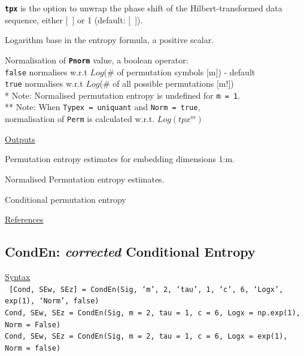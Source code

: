 \documentclass[12pt, a4paper, titlepage, openany]{book}
\begin{document}
\begin{description}[labelsep=1cm, labelwidth=2cm, nosep, style=multiline,leftmargin=3cm]
\begin{description}[labelsep=10em, labelwidth=4em, nosep,style=multiline,leftmargin=3cm]
	\item[\texttt{\emph{phase}}]	\textbf{\texttt{tpx}} is the option to unwrap the phase shift of the Hilbert-transformed data sequence, either [\ ] or 1 (default: [\ ]).				
	\end{description}
\item[\texttt{Logx}]	Logarithm base in the entropy formula, a positive scalar.
\item[\texttt{Norm}]    Normalisation of \texttt{\textbf{Pnorm}} value, a boolean operator:\\
					\texttt{false} \hspace{10pt} normalises w.r.t $Log$($\#$ of permutation symbols [m]) - default\\
     		  		\texttt{true} \hspace{15pt} normalises w.r.t $Log$($\#$ of all possible permutations [m!])\\
     		  			* Note: Normalised permutation entropy is undefined for \texttt{m = 1}.\\
     		  			** Note: When \texttt{Typex = uniquant} and \texttt{Norm = true},\\ 									normalisation of \texttt{Perm} is calculated w.r.t. $Log(tpx^m)$
\end{description}

\noindent \ul{Outputs}
\begin{description}[labelsep=1cm, labelwidth=2cm, nosep, style=multiline,leftmargin=3cm]\footnotesize
\item[\texttt{Perm}]	Permutation entropy estimates for embedding dimensions 1:m.
\item[\texttt{Pnorm}]	Normalised Permutation entropy estimates.
\item[\texttt{cPE}]		Conditional permutation entropy \cite{Perm8}
\end{description}

\noindent \ul{References}\hspace{1cm}
\cite{Perm1} \cite{Perm2} \cite{Perm3} \cite{Perm4} \cite{Perm5} \cite{Perm6} \cite{Perm7} \cite{Perm8} \cite{Perm9}



\newpage
\subsection{\normalsize CondEn: \hspace{15mm} \textit{corrected} Conditional Entropy} \label{CondEn}
\noindent\ul{Syntax} \vspace{6mm} \\ \noindent \texttt{\footnotesize
[Cond, SEw, SEz] = CondEn(Sig, ‘m’, 2, ‘tau’, 1, ‘c’, 6, ‘Logx’, exp(1), ‘Norm’, false)\\
 Cond, SEw, SEz  = CondEn(Sig, m = 2, tau = 1, c = 6, Logx = np.exp(1), Norm = False) \\
Cond, SEw, SEz  = CondEn(Sig, m = 2, tau = 1, c = 6, Logx = exp(1), Norm = false)}
\end{document}
